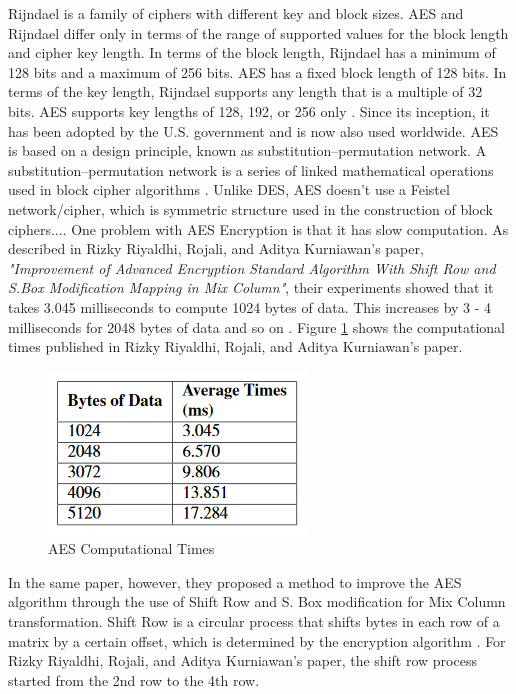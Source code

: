 \documentclass[journal]{IEEEtran}
\begin{document}
Rijndael is a family of ciphers with different key and block sizes. AES and Rijndael differ only in terms of the range of supported values for the block length and cipher key length. In terms of the block length, Rijndael has a minimum of 128 bits and a maximum of 256 bits. AES has a fixed block length of 128 bits. In terms of the key length, Rijndael supports any length that is a multiple of 32 bits. AES supports key lengths of 128, 192, or 256 only \cite{aes_rijndael_length}. Since its inception, it has been adopted by the U.S. government and is now also used worldwide. AES is based on a design principle, known as substitution–permutation network. A substitution–permutation network is a series of linked mathematical operations used in block cipher algorithms \cite{sp_network}. Unlike DES, AES doesn't use a Feistel network/cipher, which is symmetric structure used in the construction of block ciphers.... One problem with AES Encryption is that it has slow computation. As described in Rizky Riyaldhi, Rojali, and Aditya Kurniawan's paper, \textit{"Improvement of Advanced Encryption Standard Algorithm With Shift Row and S.Box Modification Mapping in Mix Column"}, their experiments showed that it takes 3.045 milliseconds to compute 1024 bytes of data. This increases by 3 - 4 milliseconds for 2048 bytes of data and so on \cite{aes_improvement}. Figure \ref{fig:aes_times} shows the computational times published in Rizky Riyaldhi, Rojali, and Aditya Kurniawan's paper.

\newline
\begin{figure}[!h]
    \centering
    \includegraphics[scale=.7]{aes_times}
    \caption{AES Computational Times}
    \label{fig:aes_times}
\end{figure}

In the same paper, however, they proposed a method to improve the AES algorithm through the use of Shift Row and S. Box modification for Mix Column transformation. Shift Row is a circular process that shifts bytes in each row of a matrix by a certain offset, which is determined by the encryption algorithm \cite{shift_row}. For Rizky Riyaldhi, Rojali, and Aditya Kurniawan's paper, the shift row process started from the 2nd row to the 4th row. 
\end{document}
